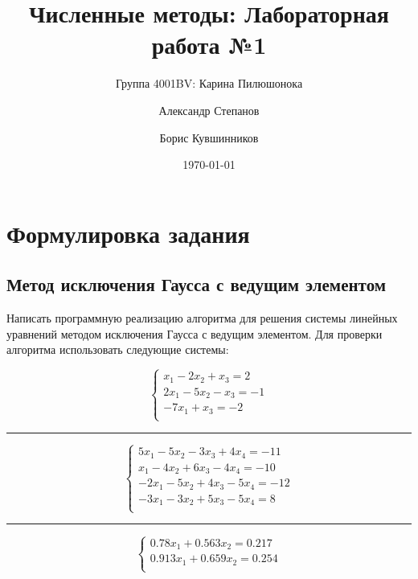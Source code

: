 \documentclass{article}
\title{Численные методы: Лабораторная работа №1}
\author{Группа 4001BV: Карина Пилюшонока \and Александр Степанов \and Борис
Кувшинников}
\date \today
\begin{document}
\maketitle
\newpage
\tableofcontents
\newpage
\section{Формулировка задания}

\subsection{Метод исключения Гаусса с ведущим элементом}
Написать программную реализацию алгоритма для решения системы линейных
уравнений методом исключения Гаусса с ведущим элементом.
Для проверки алгоритма использовать следующие системы:

\begin{displaymath}
  \left\{ \begin{array}{ll}
  x_{1} - 2x_{2} + x_{3} = 2\\
  2x_{1} - 5x_{2} - x_{3} = -1\\
  -7x_{1} + x_{3} = -2\\
\end{array} \right.
\end{displaymath}
\rule[1mm]{10cm}{0.1mm}
\begin{displaymath}
  \left\{ \begin{array}{ll}
  5x_{1} - 5x_{2} - 3x_{3} + 4x_{4} = -11\\
  x_{1} - 4x_{2} + 6x_{3} - 4x_{4} = -10\\
  -2x_{1} - 5x_{2} + 4x_{3} - 5x_{4} = -12\\
  -3x_{1} - 3x_{2} + 5x_{3} - 5x_{4} = 8\\
\end{array} \right.
\end{displaymath}
\rule[1mm]{10cm}{0.1mm}
\begin{displaymath}
  \left\{ \begin{array}{ll}
  0.78x_{1} + 0.563x_{2} = 0.217\\
  0.913x_{1} + 0.659x_{2} = 0.254\\
\end{array} \right.
\end{displaymath}
\end{document}
